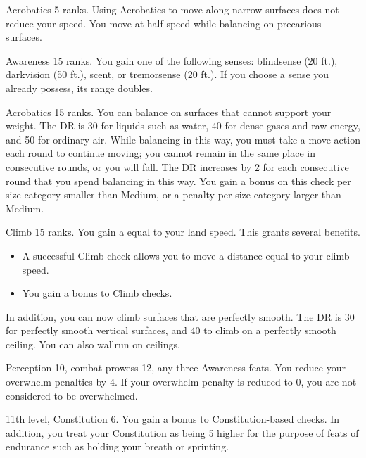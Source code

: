 \featpre Acrobatics 5 ranks.
\featben Using Acrobatics to move along narrow surfaces does not reduce your speed.
 You move at half speed while balancing on precarious surfaces.

\featpre Awareness 15 ranks.
\featben You gain one of the following senses: blindsense (20 ft.), darkvision (50 ft.), scent, or tremorsense (20 ft.).
If you choose a sense you already possess, its range doubles.

\featpre Acrobatics 15 ranks.
\featben You can balance on surfaces that cannot support your weight.
The DR is 30 for liquids such as water, 40 for dense gases and raw energy, and 50 for ordinary air.
While balancing in this way, you must take a move action each round to continue moving; you cannot remain in the same place in consecutive rounds, or you will fall.
The DR increases by 2 for each consecutive round that you spend balancing in this way.
You gain a  bonus on this check per size category smaller than Medium, or a  penalty per size category larger than Medium.

\featpre Climb 15 ranks.
\featben You gain a  equal to your land speed.
This grants several benefits.
\begin{itemize}
    \item A successful Climb check allows you to move a distance equal to your climb speed.
    \item You gain a  bonus to Climb checks.
\end{itemize}

In addition, you can now climb surfaces that are perfectly smooth.
The DR is 30 for perfectly smooth vertical surfaces, and 40 to climb on a perfectly smooth ceiling.
You can also wallrun on ceilings.

\featpres Perception 10, combat prowess 12, any three Awareness feats.
\featben You reduce your overwhelm penalties by 4.
If your overwhelm penalty is reduced to 0, you are not considered to be overwhelmed.

\featpres 11th level, Constitution 6.
\featben You gain a  bonus to Constitution-based checks.
In addition, you treat your Constitution as being 5 higher for the purpose of feats of endurance such as holding your breath or sprinting.


